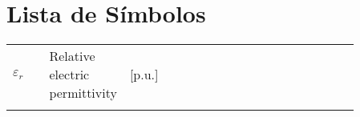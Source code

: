 \chapter*{Lista de Símbolos}

\noindent
\pagestyle{fancy}

\begin{longtable}{l l l p{0.86\linewidth}}
$\varepsilon_r$ &   & Relative electric permittivity &[p.u.]\\\\

\end{longtable} 